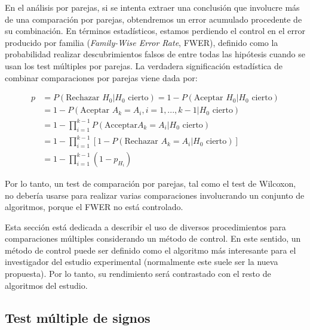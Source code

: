 En el análisis por parejas, si se intenta extraer una conclusión que involucre más de una comparación por parejas, obtendremos un error acumulado procedente de su combinación. 
En términos estadísticos, estamos perdiendo el control en el error producido por familia (\textit{Family-Wise Error Rate}, FWER), definido como la probabilidad realizar descubrimientos falsos de entre todas las hipótesis cuando se usan los test múltiples por parejas. 
La verdadera significación estadística de combinar comparaciones por parejas viene dada por: 

\begin{equation*}
\begin{aligned}
p & = P(\text{Rechazar }H_0 | H_0 \text{ cierto}) = 1 - P(\text{Aceptar }H_0 | H_0 \text{ cierto})\\
 & = 1 - P(\text{Aceptar }A_k=A_i, i=1,...,k -1 | H_0 \text{ cierto}) \\
 & = 1 - \prod_{i=1}^{k-1}P(\text{Acceptar} A_k=A_i | H_0 \text{ cierto}) \\ 
 & = 1- \prod_{i=1}^{k-1}[1 - P(\text{Rechazar } A_k=A_i | H_0 \text{ cierto} )] \\ 
 & = 1 - \prod_{i=1}^{k-1} (1-p_{H_i})
\end{aligned}
\end{equation*}

Por lo tanto, un test de comparación por parejas, tal como el test de Wilcoxon, no debería usarse para realizar varias comparaciones involucrando un conjunto de algoritmos, porque el FWER no está controlado. 

Esta sección está dedicada a describir el uso de diversos procedimientos para comparaciones múltiples considerando un método de control. 
En este sentido, un método de control puede ser definido como el algoritmo más interesante para el investigador del estudio experimental (normalmente este suele ser la nueva propuesta). 
Por lo tanto, su rendimiento será contrastado con el resto de algoritmos del estudio. 

\subsection{Test múltiple de signos}

